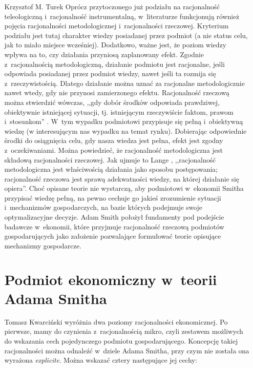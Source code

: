 \begin{artplenv}{Krzysztof M. Turek}
Oprócz przytoczonego już podziału na racjonalność teleologiczną i~racjonalność instrumentalną, w~literaturze funkcjonują
również pojęcia racjonalności metodologicznej i~racjonalności rzeczowej. Kryterium podziału jest tutaj charakter wiedzy
posiadanej przez podmiot (a nie status celu, jak to miało miejsce wcześniej). Dodatkowo, ważne jest, że poziom wiedzy
wpływa na to, czy działania przyniosą zaplanowany efekt. Zgodnie z~racjonalnością metodologiczną, działanie podmiotu
jest racjonalne, jeśli odpowiada posiadanej przez podmiot wiedzy, nawet jeśli ta rozmija się z~rzeczywistością. Dlatego
działanie można uznać za racjonalne metodologicznie nawet wtedy, gdy nie przynosi zamierzonego efektu. Racjonalność
rzeczową można stwierdzić wówczas, ,,gdy dobór środków odpowiada prawdziwej, obiektywnie istniejącej sytuacji, tj.
istniejącym rzeczywiście faktom, prawom i~stosunkom''
\parencite[s.~140]{lange_ekonomia_1978}.
W~tym wypadku
podmiotowi przypisuje się pełną i~obiektywną wiedzę (w interesującym nas wypadku na temat rynku). Dobierając
odpowiednie środki do osiągnięcia celu, gdy nasza wiedza jest pełna, efekt jest zgodny z~oczekiwaniami. Można
powiedzieć, że racjonalność metodologiczna jest składową racjonalności rzeczowej. Jak ujmuje to Lange
\parencite*[s.~140]{lange_ekonomia_1978},
,,racjonalność metodologiczna jest właściwością działania jako sposobu
postępowania; racjonalność rzeczowa jest sprawą adekwatności wiedzy, na której działanie się opiera''. Choć opisane
teorie nie wystarczą, aby podmiotowi w~ekonomii Smitha przypisać\textit{ }wiedzę pełną, na pewno cechuje go jakieś
zrozumienie sytuacji i~mechanizmów gospodarczych, na bazie których podejmuje swoje optymalizacyjne decyzje. Adam Smith
położył fundamenty pod podejście badawcze w~ekonomii, które przyjmuje racjonalność rzeczową podmiotów gospodarujących
jako założenie pozwalające formułować teorie opisujące mechanizmy gospodarcze.

\section{Podmiot ekonomiczny w~teorii Adama Smitha}

Tomasz Kwarciński
\parencite*{klosinski_racjonalnosc_2009}
wyróżnia
dwa poziomy racjonalności ekonomicznej. Po pierwsze, mamy do czynienia z~racjonalnością mikro, czyli zestawem możliwych
do wskazania cech pojedynczego podmiotu gospodarującego. Koncepcję takiej racjonalności można odnaleźć w~dziele Adama
Smitha, przy czym nie została ona wyrażona \textit{explicite}. Można wskazać cztery następujące jej cechy:


\end{artplenv}
